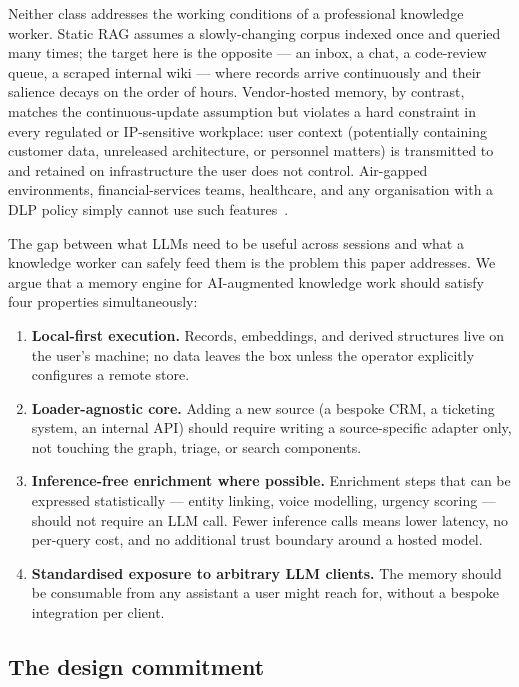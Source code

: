 Neither class addresses the working conditions of a professional knowledge
worker. Static RAG assumes a slowly-changing corpus indexed once and queried
many times; the target here is the opposite --- an inbox, a chat, a code-review
queue, a scraped internal wiki --- where records arrive continuously and their
salience decays on the order of hours. Vendor-hosted memory, by contrast,
matches the continuous-update assumption but violates a hard constraint in every
regulated or IP-sensitive workplace: user context (potentially containing
customer data, unreleased architecture, or personnel matters) is transmitted to
and retained on infrastructure the user does not control. Air-gapped
environments, financial-services teams, healthcare, and any organisation with a
DLP policy simply cannot use such features~\cite{TODO-privacy-llm-2024}.

The gap between what LLMs need to be useful across sessions and what a
knowledge worker can safely feed them is the problem this paper addresses. We
argue that a memory engine for AI-augmented knowledge work should satisfy four
properties simultaneously:

\begin{enumerate}
    \item \textbf{Local-first execution.} Records, embeddings, and derived
    structures live on the user's machine; no data leaves the box unless the
    operator explicitly configures a remote store.
    \item \textbf{Loader-agnostic core.} Adding a new source (a bespoke CRM, a
    ticketing system, an internal API) should require writing a source-specific
    adapter only, not touching the graph, triage, or search components.
    \item \textbf{Inference-free enrichment where possible.} Enrichment steps
    that can be expressed statistically --- entity linking, voice modelling,
    urgency scoring --- should not require an LLM call. Fewer inference calls
    means lower latency, no per-query cost, and no additional trust boundary
    around a hosted model.
    \item \textbf{Standardised exposure to arbitrary LLM clients.} The memory
    should be consumable from any assistant a user might reach for, without a
    bespoke integration per client.
\end{enumerate}

\subsection{The design commitment}

